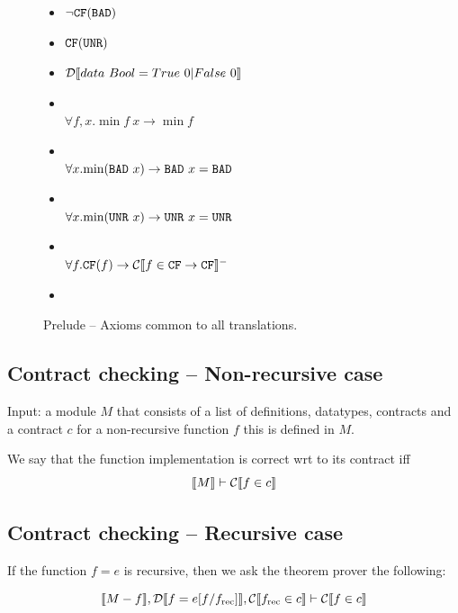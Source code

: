 \documentclass[preprint]{sigplanconf}
\begin{document}
\begin{figure}\label{fig:prelude}
  \begin{itemize}
    \item $\lnot \texttt{CF}(\texttt{BAD})$
    \item $\texttt{CF}(\texttt{UNR})$
    \item $\mathcal{D} \llbracket data~Bool = True~0 | False~0 \rrbracket$
    \item \designChoice\\ $\forall f,x. \min{f ~x} \to \min{f}$
    \item \designChoice\\ $\forall x. \mbox{min}(\texttt{BAD} ~x) \to \texttt{BAD} ~x = \texttt{BAD}$ 
    \item \designChoice\\ $\forall x. \mbox{min}(\texttt{UNR} ~x) \to \texttt{UNR} ~x = \texttt{UNR}$
    \item \designChoice\\ $\forall f. \texttt{CF}(f) \to \mathcal{C} \llbracket f \in \texttt{CF} \to \texttt{CF} \rrbracket^-$
    \item 
  \end{itemize}
  \caption{Prelude -- Axioms common to all translations.}
\end{figure}

\subsection{Contract checking -- Non-recursive case}
Input: a module $M$ that consists of a list of definitions, datatypes,
contracts and a contract $c$ for a non-recursive function $f$ this is
defined in $M$.

We say that the function implementation is correct wrt to its contract
iff $$\llbracket M \rrbracket \vdash \mathcal{C} \llbracket f \in c \rrbracket$$

\subsection{Contract checking -- Recursive case}\label{sec:recursiveContracts}
If the function $f=e$ is recursive, then we ask the theorem prover the
following:

$$\llbracket M - f \rrbracket, \mathcal{D} \llbracket f=e[f/f_\text{rec}] \rrbracket, \mathcal{C} \llbracket f_\text{rec} \in c \rrbracket \vdash \mathcal{C} \llbracket f \in c \rrbracket$$
\end{document}
